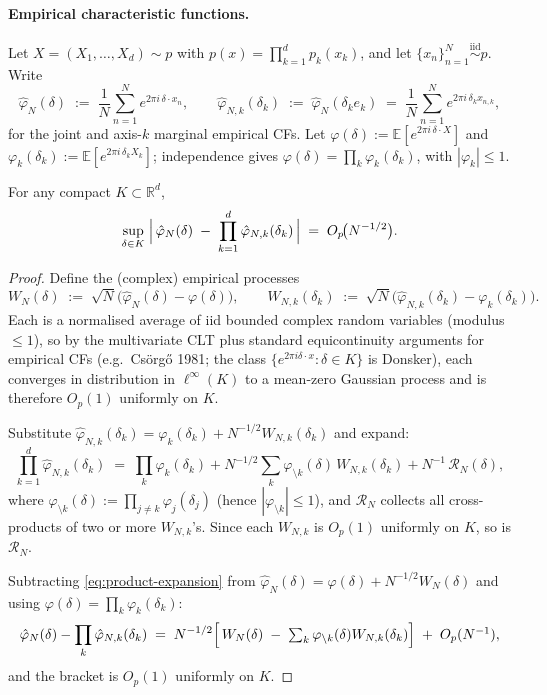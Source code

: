 \documentclass[11pt]{article}
\begin{document}
\paragraph{Empirical characteristic functions.}
Let $X = (X_1,\ldots,X_d) \sim p$ with $p(x) = \prod_{k=1}^d p_k(x_k)$, and let
$\{x_n\}_{n=1}^N \stackrel{\mathrm{iid}}{\sim} p$. Write
\begin{equation}
  \hat\varphi_N(\delta) \;:=\; \frac{1}{N}\sum_{n=1}^N e^{2\pi i\,\delta\cdot x_n},
  \qquad
  \hat\varphi_{N,k}(\delta_k) \;:=\; \hat\varphi_N(\delta_k e_k)
  \;=\; \frac{1}{N}\sum_{n=1}^N e^{2\pi i\,\delta_k x_{n,k}},
  \label{eq:ecf}
\end{equation}
for the joint and axis-$k$ marginal empirical CFs. Let
$\varphi(\delta) := \mathbb{E}[e^{2\pi i\,\delta\cdot X}]$ and
$\varphi_k(\delta_k) := \mathbb{E}[e^{2\pi i\,\delta_k X_k}]$; independence gives
$\varphi(\delta) = \prod_k \varphi_k(\delta_k)$, with $|\varphi_k| \le 1$.

\begin{lemma}\label{lem:ecf-factor}
For any compact $K \subset \mathbb{R}^d$,
\[
  \sup_{\delta \in K}\;
  \Bigl|\, \hat\varphi_N(\delta) \;-\; \prod_{k=1}^d \hat\varphi_{N,k}(\delta_k)\,\Bigr|
  \;=\; O_p\!\bigl(N^{-1/2}\bigr).
\]
\end{lemma}

\begin{proof}
Define the (complex) empirical processes
\[
  W_N(\delta)\;:=\;\sqrt{N}\bigl(\hat\varphi_N(\delta)-\varphi(\delta)\bigr),
  \qquad
  W_{N,k}(\delta_k)\;:=\;\sqrt{N}\bigl(\hat\varphi_{N,k}(\delta_k)-\varphi_k(\delta_k)\bigr).
\]
Each is a normalised average of iid bounded complex random variables
(modulus $\le 1$), so by the multivariate CLT plus standard equicontinuity
arguments for empirical CFs (e.g.\ Cs\"org\H{o} 1981; the class
$\{e^{2\pi i \delta \cdot x}:\delta\in K\}$ is Donsker), each converges in
distribution in $\ell^\infty(K)$ to a mean-zero Gaussian process and is
therefore $O_p(1)$ uniformly on $K$.

Substitute
$\hat\varphi_{N,k}(\delta_k) = \varphi_k(\delta_k) + N^{-1/2} W_{N,k}(\delta_k)$
and expand:
\begin{equation}
  \prod_{k=1}^d \hat\varphi_{N,k}(\delta_k)
  \;=\; \prod_k \varphi_k(\delta_k)
       + N^{-1/2}\sum_k \varphi_{\setminus k}(\delta)\,W_{N,k}(\delta_k)
       + N^{-1}\,\mathcal{R}_N(\delta),
  \label{eq:product-expansion}
\end{equation}
where $\varphi_{\setminus k}(\delta) := \prod_{j\ne k}\varphi_j(\delta_j)$
(hence $|\varphi_{\setminus k}|\le 1$), and $\mathcal{R}_N$ collects all
cross-products of two or more $W_{N,k}$'s. Since each $W_{N,k}$ is $O_p(1)$
uniformly on $K$, so is $\mathcal{R}_N$.

Subtracting \eqref{eq:product-expansion} from
$\hat\varphi_N(\delta) = \varphi(\delta) + N^{-1/2} W_N(\delta)$ and using
$\varphi(\delta)=\prod_k\varphi_k(\delta_k)$:
\[
  \hat\varphi_N(\delta) - \prod_k\hat\varphi_{N,k}(\delta_k)
  \;=\; N^{-1/2}\Bigl[\,W_N(\delta)\;-\;\textstyle\sum_k \varphi_{\setminus k}(\delta) W_{N,k}(\delta_k)\Bigr]
        \;+\; O_p(N^{-1}),
\]
and the bracket is $O_p(1)$ uniformly on $K$.
\end{proof}
\end{document}
